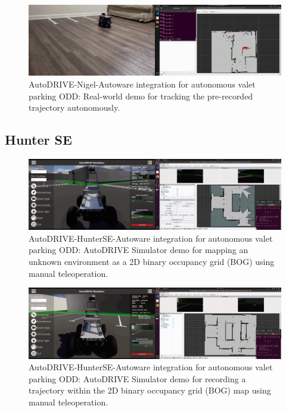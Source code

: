 \begin{figure}[H]
    \centering
    \includegraphics[width=\linewidth]{Figures/fig24.png}
    \caption{AutoDRIVE-Nigel-Autoware integration for autonomous valet parking ODD: Real-world demo for tracking the pre-recorded trajectory autonomously.}
    \label{fig: figure24}
\end{figure}

\hypertarget{Hunter SE}{%
\subsection{Hunter SE}\label{Hunter SE}}

\begin{figure}[H]
    \centering
    \includegraphics[width=\linewidth]{Figures/fig25.png}
    \caption{AutoDRIVE-HunterSE-Autoware integration for autonomous valet parking ODD: AutoDRIVE Simulator demo for mapping an unknown environment as a 2D binary occupancy grid (BOG) using manual teleoperation.}
    \label{fig: figure25}
\end{figure}

\begin{figure}[H]
    \centering
    \includegraphics[width=\linewidth]{Figures/fig26.png}
    \caption{AutoDRIVE-HunterSE-Autoware integration for autonomous valet parking ODD: AutoDRIVE Simulator demo for recording a trajectory within the 2D binary occupancy grid (BOG) map using manual teleoperation.}
    \label{fig: figure26}
\end{figure}

